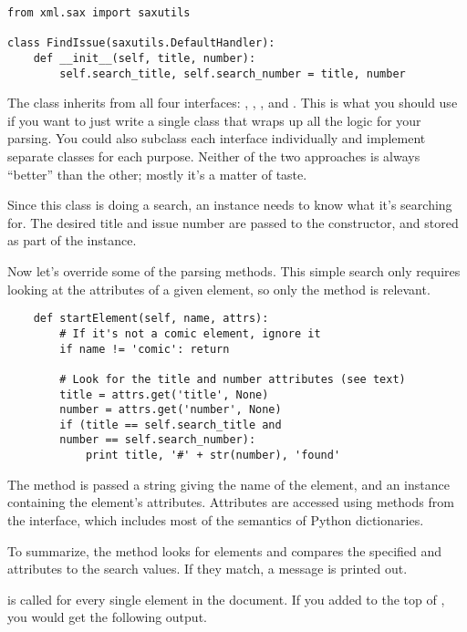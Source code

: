 \documentclass{howto}
\newcommand{\element}[1]{\code{#1}}
\newcommand{\attribute}[1]{\code{#1}}
\begin{document}
\begin{verbatim}
from xml.sax import saxutils

class FindIssue(saxutils.DefaultHandler):
    def __init__(self, title, number):
        self.search_title, self.search_number = title, number
\end{verbatim}

The  class inherits from all four interfaces:
, , ,
and .  This is what you should use if you want to
just write a single class that wraps up all the logic for your
parsing.  You could also subclass each interface individually and
implement separate classes for each purpose.  Neither of the two
approaches is always ``better'' than the other; mostly it's a matter
of taste.

Since this class is doing a search, an instance needs to know what
it's searching for.  The desired title and issue number are passed to
the  constructor, and stored as part of the instance.

Now let's override some of the parsing methods.
This simple search only requires looking at the attributes of a given
element, so only the  method is relevant.

\begin{verbatim}
    def startElement(self, name, attrs):
        # If it's not a comic element, ignore it
        if name != 'comic': return

        # Look for the title and number attributes (see text)
        title = attrs.get('title', None)
        number = attrs.get('number', None)
        if (title == self.search_title and 
	    number == self.search_number):
            print title, '#' + str(number), 'found'
\end{verbatim}

The  method is passed a string giving the name
of the element, and an instance containing the element's attributes.
Attributes are accessed using 
methods from the  interface, which
includes most of the semantics of Python dictionaries.  

To summarize, the  method looks for
\element{comic} elements and compares the specified \attribute{title}
and \attribute{number} attributes to the search values.  If they
match, a message is printed out.

 is called for every single element in the
document.  If you added  to the
top of  , you would get the following output.
\end{document}
